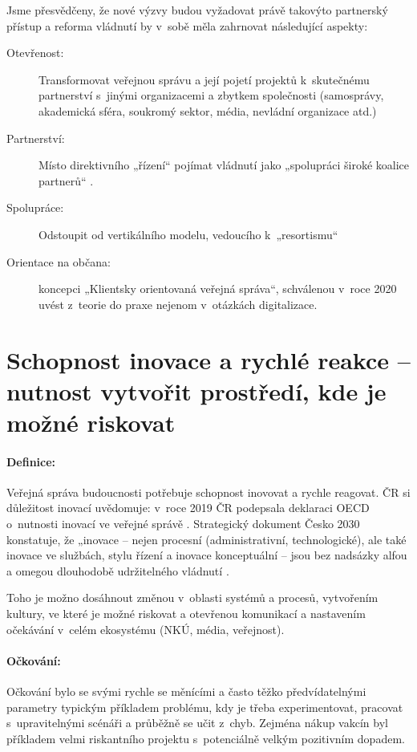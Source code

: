 Jsme přesvědčeny, že nové výzvy budou vyžadovat právě takovýto partnerský přístup \cite{christopher_blueprint_2021} a reforma vládnutí by v~sobě měla zahrnovat následující aspekty:

\begin{description}
  \item[Otevřenost:] Transformovat veřejnou správu a její pojetí projektů k~skutečnému partnerství s~jinými organizacemi a zbytkem společnosti (samosprávy, akademická sféra, soukromý sektor, média, nevládní organizace atd.)
  \item[Partnerství:] Místo direktivního „řízení“ pojímat vládnutí jako „spolupráci široké koalice partnerů“ \cite{department_of_the_prime_minister_and_cabinet_our_2019}.
  \item[Spolupráce:] Odstoupit od vertikálního modelu, vedoucího k~„resortismu“
  \item[Orientace na občana:] koncepci „Klientsky orientovaná veřejná správa“, schvá\-le\-nou v~roce 2020 \cite{koncepce_verejna_sprava_2030} uvést z~teorie do praxe nejenom v~otázkách digitalizace.
\end{description}

\section*{Schopnost inovace a rychlé reakce -- nutnost vytvořit prostředí, kde je možné riskovat}

\paragraph{Definice:} Veřejná správa budoucnosti potřebuje schopnost inovovat a rychle reagovat. ČR si důležitost inovací uvědomuje: v~roce 2019 ČR podepsala deklaraci OECD o~nutnosti inovací ve veřejné správě \cite{oecd_deklarace_2019}. Strategický dokument Česko 2030 konstatuje, že „inovace – nejen procesní (administrativní, technologické), ale také inovace ve službách, stylu řízení a inovace konceptuální – jsou bez nadsázky alfou a omegou dlouhodobě udržitelného vládnutí \cite{sr2030}.

Toho je možno dosáhnout změnou v~oblasti systémů a procesů, vytvořením kultury, ve které je možné riskovat a otevřenou komunikací a nastavením očekávání v~celém ekosystému (NKÚ, média, veřejnost).

\paragraph{Očkování:} Očkování bylo se svými rychle se měnícími a často těžko před\-ví\-da\-tel\-ný\-mi parametry typickým pří\-kla\-dem problému, kdy je třeba experimentovat, pracovat s~upravitelnými scénáři a průběžně se učit z~chyb. Zejména nákup vakcín byl příkladem velmi riskantního projektu s~potenciálně velkým pozitivním dopadem.

